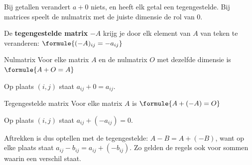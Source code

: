 Bij getallen verandert $a + 0$ niets, en heeft elk getal een tegengestelde. Bij matrices speelt de nulmatrix met de juiste dimensie de rol van 0.

\begin{theorie}
De \textbf{\textcolor{accent}{tegengestelde matrix}} $-A$ krijg je door elk element van $A$ van teken te veranderen: \quad $\formule{(-A)_{ij} = -a_{ij}}$

\begin{stelling}{Nulmatrix}
Voor elke matrix $A$ en de nulmatrix $O$ met dezelfde dimensie is \qquad $\formule{A + O = A}$
\end{stelling}

\begin{bewijs}
Op plaats $(i, j)$ staat $a_{ij} + 0 = a_{ij}$.
\end{bewijs}

\begin{stelling}{Tegengestelde matrix}
Voor elke matrix $A$ is \qquad $\formule{A + (-A) = O}$
\end{stelling}

\begin{bewijs}
Op plaats $(i, j)$ staat $a_{ij} + (-a_{ij}) = 0$.
\end{bewijs}
\end{theorie}

Aftrekken is dus optellen met de tegengestelde: $A - B = A + (-B)$, want op elke plaats staat $a_{ij} - b_{ij} = a_{ij} + (-b_{ij})$. Zo gelden de regels ook voor sommen waarin een verschil staat.


